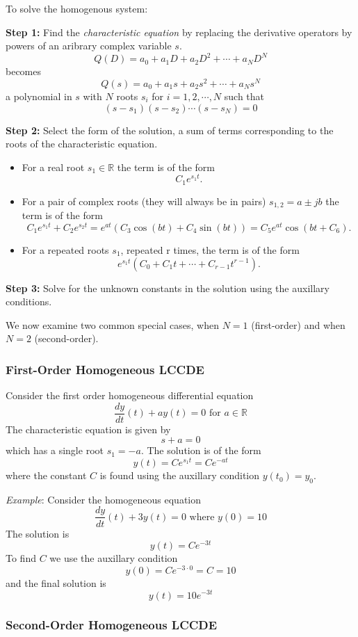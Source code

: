 To solve the homogenous system:

\textbf{Step 1:} Find the \emph{characteristic equation} by replacing the derivative operators by powers of an aribrary complex variable $s$.
\[
Q(D) = a_0 + a_1D + a_2D^2 + \cdots + a_ND^N
\]
becomes
\[
Q(s) = a_0 + a_1s + a_2s^2 + \cdots + a_Ns^N
\]
a polynomial in $s$ with $N$ roots $s_i$ for $i = 1, 2, \cdots, N$ such that
\[
(s - s_1)(s-s_2)\cdots(s-s_N) = 0
\]

\textbf{Step 2:} Select the form of the solution, a sum of terms corresponding to the roots of the characteristic equation.

\begin{itemize}
\item For a real root $s_1\in \mathbb{R}$ the term is of the form
  \[
  C_1 e^{s_1 t}.
  \]
\item For a pair of complex roots (they will always be in pairs) $s_{1,2} = a \pm jb$ the term is of the form
  \[
  C_1 e^{s_1 t} + C_2 e^{s_2 t} = e^{a t}\left(C_3\cos(bt) + C_4\sin(bt)\right) = C_5 e^{a t}\cos(bt + C_6).
  \]
\item For a repeated roots $s_1$, repeated r times, the term is of the form
  \[
  e^{s_1 t} (C_0 + C_1 t + \cdots + C_{r-1} t^{r-1}).\]
\end{itemize}

\textbf{Step 3:} Solve for the unknown constants in the solution using the auxillary conditions. 

We now examine two common special cases, when $N=1$ (first-order) and when $N=2$ (second-order).

\subsubsection{First-Order Homogeneous LCCDE}

Consider the first order homogeneous differential equation
\[
\frac{dy}{dt}(t) + ay(t) = 0 \mbox{ for } a \in \mathbb{R}
\]
The characteristic equation is given by
\[
s + a = 0
\]
which has a single root $s_1 = -a$. The solution is of the form
\[
y(t) = Ce^{s_1 t} = Ce^{-a t} 
\]
where the constant $C$ is found using the auxillary condition $y(t_0) = y_0$.

\textit{Example}: Consider the homogeneous equation
\[
\frac{dy}{dt}(t) + 3y(t) = 0 \mbox{ where } y(0) = 10
\]
The solution is
\[
y(t) = Ce^{-3 t} 
\]
To find $C$ we use the auxillary condition
\[
y(0) = Ce^{-3 \cdot 0} = C = 10
\]
and the final solution is
\[
y(t) = 10e^{-3 t} 
\]
\subsubsection{Second-Order Homogeneous LCCDE}

